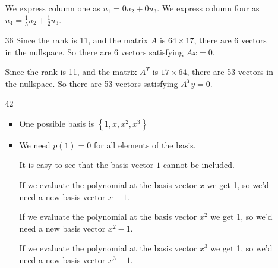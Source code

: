 \documentclass[12pt,letterpaper]{article}
\begin{document}
\begin{enumerate}[label=\S 2.\arabic*]
\begin{enumerate}
          We express column one as $u_1 = 0u_2 + 0u_3$.
          We express column four as $u_4 = \frac{1}{5}u_2 + \frac{1}{2}u_3$.
        \item [36]
          Since the rank is 11, and the matrix $A$ is $64 \times 17$,
          there are 6 vectors in the nullspace.
          So there are 6 vectors satisfying $Ax = 0$.

          Since the rank is 11, and the matrix $A^T$ is $17 \times 64$,
          there are 53 vectors in the nullspace.
          So there are 53 vectors satisfying $A^Ty = 0$.
        \item [42]
          \begin{itemize}
            \item One possible basis is $\left\{1, x, x^2, x^3\right\}$
            \item
              We need $p(1) = 0$ for all elements of the basis.

              It is easy to see that the basis vector $1$ cannot be included.

              If we evaluate the polynomial at the basis vector $x$ we get 1,
              so we'd need a new basis vector $x - 1$.

              If we evaluate the polynomial at the basis vector $x^2$ we get 1,
              so we'd need a new basis vector $x^2 - 1$.

              If we evaluate the polynomial at the basis vector $x^3$ we get 1,
              so we'd need a new basis vector $x^3 - 1$.


\end{itemize}
\end{enumerate}
\end{enumerate}
\end{document}
